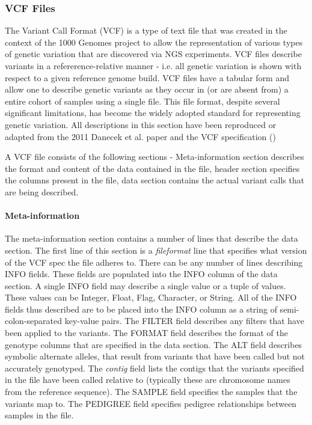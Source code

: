 \subsubsection{VCF Files}
The Variant Call Format (VCF)\autocite{danecek2011variant} is a type of text file that was created in the context of the 1000 Genomes project to allow the representation of various types of genetic variation that are discovered via NGS experiments. VCF files describe variants in a refererence-relative manner - i.e. all genetic variation is shown with respect to a given reference genome build. VCF files have a tabular form and allow one to describe genetic variants as they occur in (or are absent from) a entire cohort of samples using a single file. This file format, despite several significant limitations, has become the widely adopted standard for representing genetic variation. All descriptions in this section have been reproduced or adapted from the 2011 Danecek et al. paper and the VCF specification ()   

A VCF file consists of the following sections - Meta-information section describes the format and content of the data contained in the file, header section specifies the columns present in the file, data section contains the actual variant calls that are being described.

\paragraph{Meta-information}
The meta-information section contains a number of lines that describe the data section. The first line of this section is a \emph{fileformat} line that specifies what version of the VCF spec the file adheres to. There can be any number of lines describing INFO fields. These fields are populated into the INFO column of the data section. A single INFO field may describe a single value or a tuple of values. These values can be Integer, Float, Flag, Character, or String. All of the INFO fields thus described are to be placed into the INFO column as a string of semi-colon-separated key-value pairs. The FILTER field describes any filters that have been applied to the variants. The FORMAT field describes the format of the genotype columns that are specified in the data section. The ALT field describes symbolic alternate alleles, that result from variants that have been called but not accurately genotyped. The \emph{contig} field lists the contigs that the variants specified in the file have been called relative to (typically these are chromosome names from the reference sequence). The SAMPLE field specifies the samples that the variants map to. The PEDIGREE field specifies pedigree relationships between samples in the file.

